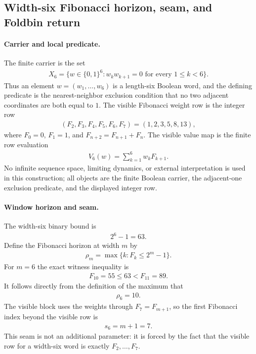 \subsection{Width-six Fibonacci horizon, seam, and Foldbin return}
\label{sec:window6-fibonacci-horizon-seam-return-foldbin-unification}

\paragraph{Carrier and local predicate.}
The finite carrier is the set
$$
\begin{aligned}
X_6=\{w\in \{0,1\}^6: w_k w_{k+1}=0\text{ for every }1\leq k<6\}.
\end{aligned}
$$
Thus an element $w=(w_1,\ldots,w_6)$ is a length-six Boolean word, and the defining predicate is the nearest-neighbor exclusion condition that no two adjacent coordinates are both equal to $1$. The visible Fibonacci weight row is the integer row
$$
\begin{aligned}
( F_2,F_3,F_4,F_5,F_6,F_7 )=(1,2,3,5,8,13),
\end{aligned}
$$
where $F_0=0$, $F_1=1$, and $F_{n+2}=F_{n+1}+F_n$. The visible value map is the finite row evaluation
$$
\begin{aligned}
V_6(w)=\sum_{k=1}^{6} w_k F_{k+1}.
\end{aligned}
$$
No infinite sequence space, limiting dynamics, or external interpretation is used in this construction; all objects are the finite Boolean carrier, the adjacent-one exclusion predicate, and the displayed integer row.

\paragraph{Window horizon and seam.}
The width-six binary bound is
$$
\begin{aligned}
2^6-1=63.
\end{aligned}
$$
Define the Fibonacci horizon at width $m$ by
$$
\begin{aligned}
\rho_m=\max\{k:F_k\leq 2^m-1\}.
\end{aligned}
$$
For $m=6$ the exact witness inequality is
$$
\begin{aligned}
F_{10}=55\leq 63<F_{11}=89.
\end{aligned}
$$
It follows directly from the definition of the maximum that
$$
\begin{aligned}
\rho_6=10.
\end{aligned}
$$
The visible block uses the weights through $F_7=F_{m+1}$, so the first Fibonacci index beyond the visible row is
$$
\begin{aligned}
s_6=m+1=7.
\end{aligned}
$$
This seam is not an additional parameter: it is forced by the fact that the visible row for a width-six word is exactly $F_2,\ldots,F_7$.

